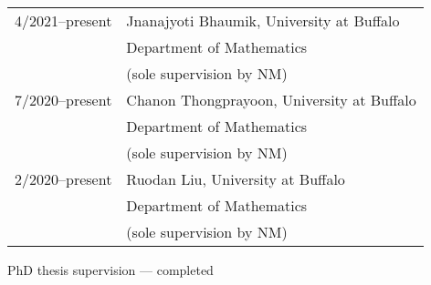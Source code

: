 \documentclass[11pt,letter]{article}
\renewenvironment{itemize}{
  \begin{list}{}{
    \setlength{\leftmargin}{1.5em}
    \setlength{\itemsep}{0.25em}
    \setlength{\parskip}{0pt}
    \setlength{\parsep}{0.25em}
  }
}{
  \end{list}
}
\begin{document}
\begin{itemize}
\begin{tabular}{ll}
%
4/2021--present & Jnanajyoti Bhaumik, University at Buffalo\\
& Department of Mathematics\\
& (sole supervision by NM)\\[1.5mm]
%
%
7/2020--present & Chanon Thongprayoon, University at Buffalo\\
& Department of Mathematics\\
& (sole supervision by NM)\\[1.5mm]
%
2/2020--present & Ruodan Liu, University at Buffalo\\
& Department of Mathematics\\
& (sole supervision by NM)
\end{tabular}

\bigskip

\item PhD thesis supervision --- completed

\smallskip


\end{itemize}
\end{document}
